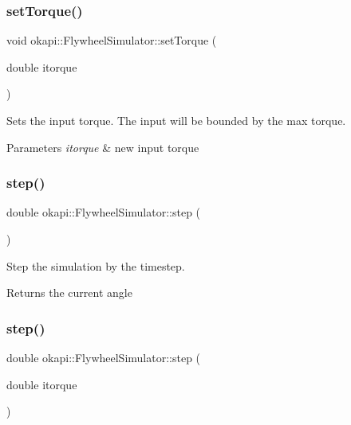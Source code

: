 \subsubsection{\texorpdfstring{setTorque()}{setTorque()}}
{\footnotesize\ttfamily void okapi\+::\+Flywheel\+Simulator\+::set\+Torque (\begin{DoxyParamCaption}\item[{double}]{itorque }\end{DoxyParamCaption})}

Sets the input torque. The input will be bounded by the max torque.


\begin{DoxyParams}{Parameters}
{\em itorque} & new input torque \\
\hline
\end{DoxyParams}
\mbox{\label{classokapi_1_1FlywheelSimulator_a05ea33d225b636b14c7c8aab9ffb7fa8}} 
\subsubsection{\texorpdfstring{step()}{step()}\hspace{0.1cm}{\footnotesize\ttfamily [1/2]}}
{\footnotesize\ttfamily double okapi\+::\+Flywheel\+Simulator\+::step (\begin{DoxyParamCaption}{ }\end{DoxyParamCaption})}

Step the simulation by the timestep.

\begin{DoxyReturn}{Returns}
the current angle 
\end{DoxyReturn}
\mbox{\label{classokapi_1_1FlywheelSimulator_a5da369045882dc962b1aff79eeaf1905}} 
\subsubsection{\texorpdfstring{step()}{step()}\hspace{0.1cm}{\footnotesize\ttfamily [2/2]}}
{\footnotesize\ttfamily double okapi\+::\+Flywheel\+Simulator\+::step (\begin{DoxyParamCaption}\item[{double}]{itorque }\end{DoxyParamCaption})}

